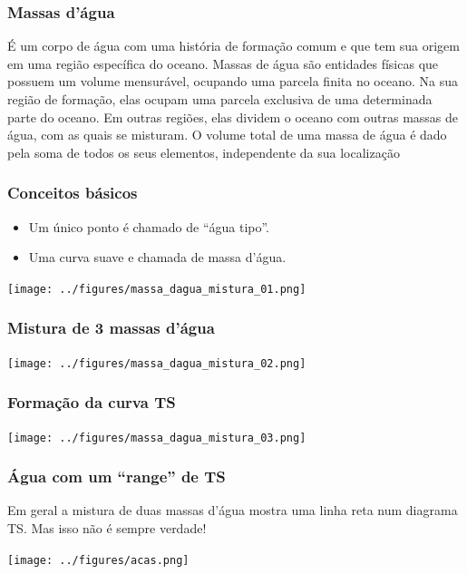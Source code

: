\begin{frame}
\frametitle{Massas d'água}
{\small
\begin{block}{}
  É um corpo de água com uma história de formação comum e que tem sua origem em
  uma região específica do oceano. Massas de água são entidades físicas que
  possuem um volume mensurável, ocupando uma parcela finita no oceano. Na sua
  região de formação, elas ocupam uma parcela exclusiva de uma determinada
  parte do oceano. Em outras regiões, elas dividem o oceano com outras massas
  de água, com as quais se misturam. O volume total de uma massa de água é dado
  pela soma de todos os seus elementos, independente da sua localização
\end{block}
}
\end{frame}


\begin{frame}
\frametitle{Conceitos básicos}
  \begin{itemize}[<+-| alert@+>]
    \item Um único ponto é chamado de ``água tipo''.
    \item Uma curva suave e chamada de massa d'água.
  \end{itemize}
  \pause
  \begin{center}
    \texttt{[image: ../figures/massa\_dagua\_mistura\_01.png]}
  \end{center}
\end{frame}


\begin{frame}
\frametitle{Mistura de 3 massas d'água}
  \begin{center}
    \texttt{[image: ../figures/massa\_dagua\_mistura\_02.png]}
  \end{center}
\end{frame}


\begin{frame}
\frametitle{Formação da curva TS}
  \begin{center}
    \texttt{[image: ../figures/massa\_dagua\_mistura\_03.png]}
  \end{center}
\end{frame}


\begin{frame}
\frametitle{Água com um ``range'' de TS}
{\small
\begin{block}{}
  Em geral a mistura de duas massas d'água mostra uma linha reta num diagrama TS.  Mas isso não é sempre verdade!
\end{block}
}
  \begin{center}
    \texttt{[image: ../figures/acas.png]}
  \end{center}
\end{frame}


